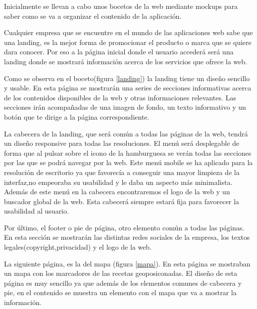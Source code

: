 Inicialmente se llevan a cabo unos bocetos de la web mediante mockups para saber como se va a organizar el contenido de la aplicación.

\vspace{5 mm}

Cualquier empresa que se encuentre en el mundo de las aplicaciones web sabe que una landing, es la mejor forma de promocionar el producto o marca que se quiere dara conocer. Por eso a la página inicial donde el usuario accederá será una landing donde se mostrará información acerca de los servicios que ofrece la web.

\vspace{5 mm}

Como se observa en el boceto(figura \ref{landing}) la landing tiene un diseño sencillo y usable. En esta página se mostrarán una series de secciones informativas acerca de los contenidos disponibles de la web y otras informaciones relevantes. Las secciones irán acompañadas de una imagen de fondo, un texto informativo y un botón que te dirige a la página correspondiente.

\vspace{5 mm}

La cabecera de la landing, que será común a todas las páginas de la web, tendrá un diseño responsive para todas las resoluciones. El menú será desplegable de forma que al pulsar sobre el icono de  la hamburguesa se verán todas las secciones por las que se podrá navegar por la web. Este menú mobile se ha aplicado para la resolución de escritorio ya que favorecía a conseguir una mayor limpieza de la interfaz,no empeoraba su usabilidad y le daba un aspecto más minimalista. Además de este menú en la cabecera encontraremos el logo de la web y un buscador global de la web. Esta cabecerá siempre estará fija para favorecer la usabilidad al usuario.

\vspace{5 mm}

Por último, el footer o pie de página, otro elemento común a todas las páginas. En esta sección se mostrarán las distintas redes sociales de la empresa, los textos legales(copyright,privacidad) y el logo de la web.


\vspace{5 mm}

La siguiente página, es la del mapa (figura \ref{mapa}). En esta página se mostraban un mapa con los marcadores de las recetas geoposiconadas. El diseño de esta página es muy sencillo ya que además de los elementos comunes de cabecera y pie, en el contenido se muestra un elemento con el mapa que va a mostrar la información.

